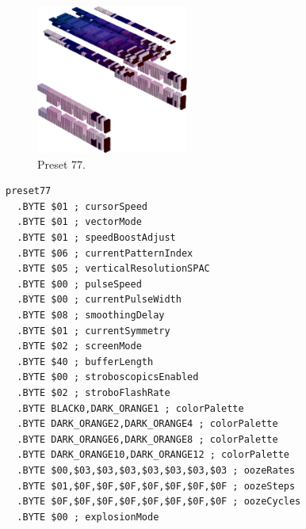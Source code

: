 \vspace*{-0.5cm}
\begin{minipage}[b]{0.48\linewidth}
\begin{figure}[H]                                                          
  \centering                                                             
  \begin{adjustbox}{width=5cm,center}                                   
  \includegraphics[width=5cm]{src/colorspace_presets/preset77-45.png}%
  \end{adjustbox}                                                        
\caption*{Preset 77.}                                           
\end{figure}                                                               
\end{minipage}
\hspace{0.1cm}
\begin{minipage}[b]{0.48\linewidth}                                                                         
\begin{lstlisting}[basicstyle=\ttfamily\tiny]
preset77
  .BYTE $01 ; cursorSpeed
  .BYTE $01 ; vectorMode
  .BYTE $01 ; speedBoostAdjust
  .BYTE $06 ; currentPatternIndex
  .BYTE $05 ; verticalResolutionSPAC
  .BYTE $00 ; pulseSpeed
  .BYTE $00 ; currentPulseWidth
  .BYTE $08 ; smoothingDelay
  .BYTE $01 ; currentSymmetry
  .BYTE $02 ; screenMode
  .BYTE $40 ; bufferLength
  .BYTE $00 ; stroboscopicsEnabled
  .BYTE $02 ; stroboFlashRate
  .BYTE BLACK0,DARK_ORANGE1 ; colorPalette
  .BYTE DARK_ORANGE2,DARK_ORANGE4 ; colorPalette
  .BYTE DARK_ORANGE6,DARK_ORANGE8 ; colorPalette
  .BYTE DARK_ORANGE10,DARK_ORANGE12 ; colorPalette
  .BYTE $00,$03,$03,$03,$03,$03,$03,$03 ; oozeRates
  .BYTE $01,$0F,$0F,$0F,$0F,$0F,$0F,$0F ; oozeSteps
  .BYTE $0F,$0F,$0F,$0F,$0F,$0F,$0F,$0F ; oozeCycles
  .BYTE $00 ; explosionMode
\end{lstlisting}
\end{minipage}


